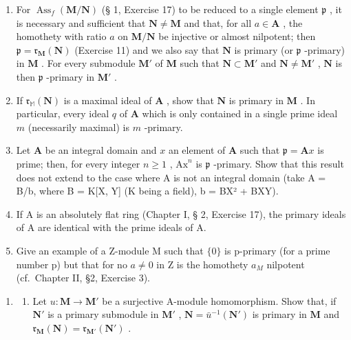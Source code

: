 \begin{enumerate}
\def\labelenumi{(\alph{enumi})}
\item
  For \(\operatorname{Ass}_f(\mathbf{M} / \mathbf{N})\) (§ 1, Exercise 17) to be reduced to a single element \(\mathfrak{p}\) , it is necessary and sufficient that \(\mathbf{N} \neq \mathbf{M}\) and that, for all \(a \in \mathbf{A}\) , the homothety with ratio \(a\) on \(\mathbf{M} / \mathbf{N}\) be injective or almost nilpotent; then \(\mathfrak{p} = \mathfrak{r}_{\mathbf{M}}(\mathbf{N})\) (Exercise 11) and we also say that \(\mathbf{N}\) is primary (or \(\mathfrak{p}\) -primary) in \(\mathbf{M}\) . For every submodule \(\mathbf{M}'\) of \(\mathbf{M}\) such that \(\mathbf{N} \subset \mathbf{M}'\) and \(\mathbf{N} \neq \mathbf{M}'\) , \(\mathbf{N}\) is then \(\mathfrak{p}\) -primary in \(\mathbf{M}'\) .
\item
  If \(\mathfrak{r}_{\mathbb{M}}(\mathbf{N})\) is a maximal ideal of \(\mathbf{A}\) , show that \(\mathbf{N}\) is primary in \(\mathbf{M}\) . In particular, every ideal \(q\) of \(\mathbf{A}\) which is only contained in a single prime ideal \(m\) (necessarily maximal) is \(m\) -primary.
\item
  Let \(\mathbf{A}\) be an integral domain and \(x\) an element of \(\mathbf{A}\) such that \(\mathfrak{p} = \mathbf{A}x\) is prime; then, for every integer \(n \geqslant 1\) , \(\mathrm{Ax}^n\) is \(\mathfrak{p}\) -primary. Show that this result does not extend to the case where A is not an integral domain (take A = B/b, where B = K{[}X, Y{]} (K being a field), b = BX² + BXY).
\item
  If A is an absolutely flat ring (Chapter I, § 2, Exercise 17), the primary ideals of A are identical with the prime ideals of A.
\item
  Give an example of a Z-module M such that \(\{0\}\) is p-primary (for a prime number p) but that for no \(a \neq 0\) in Z is the homothety \(a_{M}\) nilpotent (cf.~Chapter II, §2, Exercise 3).
\end{enumerate}

\begin{enumerate}
\def\labelenumi{\arabic{enumi}.}
\setcounter{enumi}{12}
\tightlist
\item
  \begin{enumerate}
  \def\labelenumii{(\alph{enumii})}
  \tightlist
  \item
    Let \(u: \mathbf{M} \to \mathbf{M}'\) be a surjective A-module homomorphism. Show that, if \(\mathbf{N}'\) is a primary submodule in \(\mathbf{M}'\) , \(\mathbf{N} = \bar{u}^{-1}(\mathbf{N}')\) is primary in \(\mathbf{M}\) and \(\mathfrak{r}_{\mathbf{M}}(\mathbf{N}) = \mathfrak{r}_{\mathbf{M}'}(\mathbf{N}')\) .
  \end{enumerate}
\end{enumerate}


